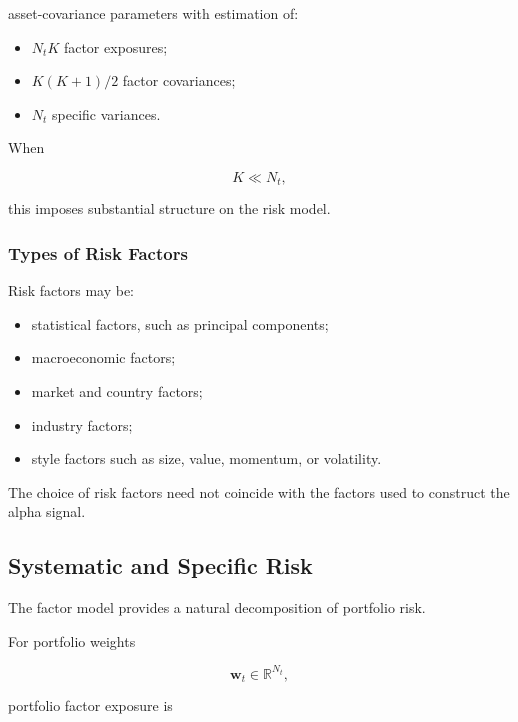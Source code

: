 \documentclass[11pt,a4paper]{article}
\begin{document}
asset-covariance parameters with estimation of:

\begin{itemize}
    \item $N_tK$ factor exposures;
    \item $K(K+1)/2$ factor covariances;
    \item $N_t$ specific variances.
\end{itemize}

When

\begin{equation}
K\ll N_t,
\end{equation}

this imposes substantial structure on the risk model.


\subsubsection{Types of Risk Factors}

Risk factors may be:

\begin{itemize}
    \item statistical factors, such as principal components;
    \item macroeconomic factors;
    \item market and country factors;
    \item industry factors;
    \item style factors such as size, value, momentum, or volatility.
\end{itemize}

The choice of risk factors need not coincide with the factors used to construct
the alpha signal.


\subsection{Systematic and Specific Risk}
\label{subsec:systematic_specific_risk}

The factor model provides a natural decomposition of portfolio risk.

For portfolio weights

\begin{equation}
\mathbf{w}_t
\in
\mathbb{R}^{N_t},
\end{equation}

portfolio factor exposure is
\end{document}
